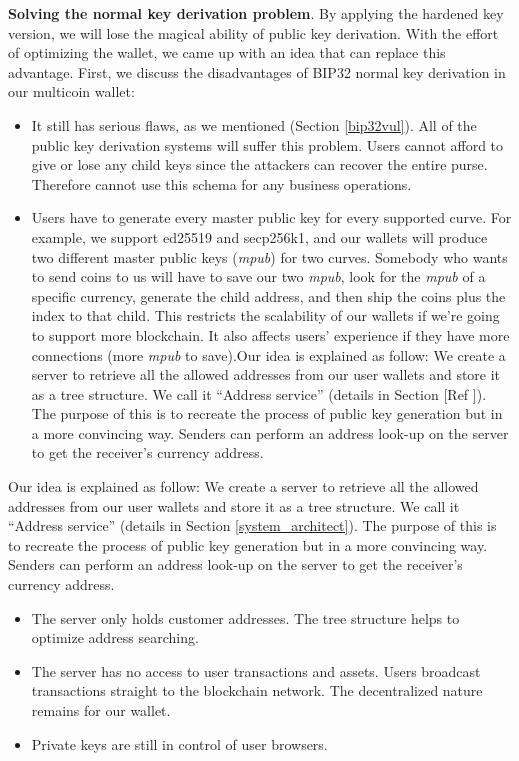\bigskip
{\textbf{Solving the normal key derivation problem}}. By applying the hardened key version, we will lose the magical ability of public key derivation. With the effort of optimizing the wallet, we came up with an idea that can replace this advantage. First, we discuss the disadvantages of BIP32 normal key derivation in our multicoin wallet:

\begin{itemize}
    \item It still has serious flaws, as we mentioned (Section \ref{bip32vul}). All of the public key derivation systems will suffer this problem. Users cannot afford to give or lose any child keys since the attackers can recover the entire purse. Therefore cannot use this schema for any business operations.

    \item Users have to generate every master public key for every supported curve. For example, we support ed25519 and secp256k1, and our wallets will produce two different master public keys (\textit{mpub}) for two curves. Somebody who wants to send coins to us will have to save our two \textit{mpub}, look for the \textit{mpub} of a specific currency, generate the child address, and then ship the coins plus the index to that child. This restricts the scalability of our wallets if we're going to support more blockchain. It also affects users' experience if they have more connections (more \textit{mpub} to save).Our idea is explained as follow:
            We create a server to retrieve all the allowed addresses from our user wallets and store it as a tree structure. We call it “Address service” (details in Section [Ref ]). The purpose of this is to recreate the process of public key generation but in a more convincing way. Senders can perform an address look-up on the server to get the receiver’s currency address.

\end{itemize}

Our idea is explained as follow:
We create a server to retrieve all the allowed addresses from our user wallets and store it as a tree structure. We call it “Address service” (details in Section \ref{system_architect}). The purpose of this is to recreate the process of public key generation but in a more convincing way. Senders can perform an address look-up on the server to get the receiver’s currency address.

\begin{itemize}
    \item The server only holds customer addresses. The tree structure helps to optimize address searching.
    \item The server has no access to user transactions and assets. Users broadcast transactions straight to the blockchain network. The decentralized nature remains for our wallet.
    \item Private keys are still in control of user browsers.
\end{itemize}

